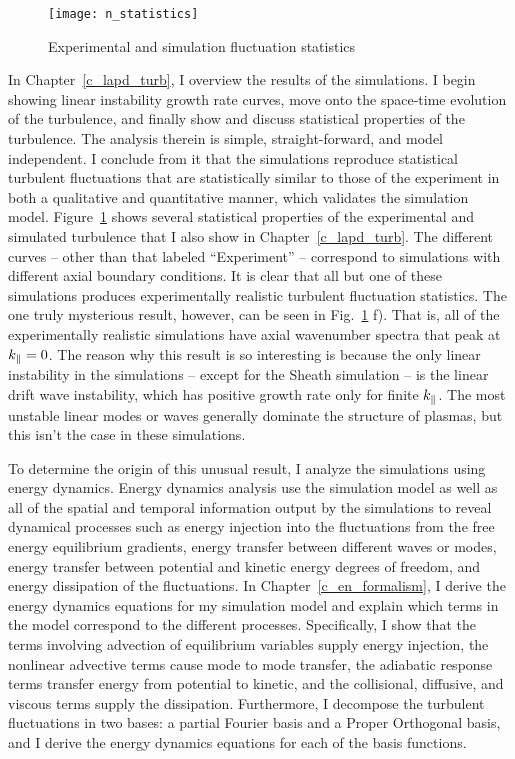 \begin{figure}
\centerline{\texttt{[image: n\_statistics]}}
\caption{Experimental and simulation fluctuation statistics}
\label{n_statistics_intro}
\end{figure}

In Chapter~\ref{c_lapd_turb}, I overview the results of the simulations. I begin showing linear instability growth rate curves, move onto the space-time evolution of the turbulence, and finally
show and discuss statistical properties of the turbulence. The analysis therein is simple, straight-forward, and model independent. I conclude from it that the simulations reproduce
statistical turbulent fluctuations that are statistically similar to those of the experiment in both a qualitative and quantitative manner, which validates the simulation model. 
Figure~\ref{n_statistics_intro} shows several statistical properties of the experimental and simulated turbulence that I also show in Chapter~\ref{c_lapd_turb}. 
The different curves -- other than that labeled ``Experiment'' -- correspond to simulations with different axial boundary conditions. 
It is clear that all but one of these simulations produces experimentally realistic turbulent fluctuation statistics. The one truly mysterious result, however, can be seen in
Fig.~\ref{n_statistics_intro} f). That is, all of the experimentally realistic simulations have axial wavenumber spectra that peak at $k_\parallel = 0$. The reason why this result is so interesting
is because the only linear instability in the simulations -- except for the Sheath simulation -- is the linear drift wave instability, which has positive growth rate only for finite $k_\parallel$.
The most unstable linear modes or waves generally dominate the structure of plasmas, but this isn't the case in these simulations.

To determine the origin of this unusual result, I analyze the simulations using energy dynamics.
Energy dynamics analysis use the simulation model as well as all of the spatial and temporal information output by the simulations to reveal dynamical processes such as 
energy injection into the fluctuations from the free energy equilibrium gradients, energy transfer between different waves or modes,
energy transfer between potential and kinetic energy degrees of freedom, and energy dissipation of the fluctuations. In Chapter~\ref{c_en_formalism}, I derive the energy dynamics equations for my
simulation model and explain which terms in the model correspond to the different processes. Specifically, I show that the terms involving advection of equilibrium variables
supply energy injection, the nonlinear advective terms cause mode to mode transfer, the adiabatic response terms transfer energy from potential to kinetic, and the collisional, diffusive,
and viscous terms supply the dissipation. Furthermore, I decompose the turbulent fluctuations in two bases: a partial Fourier basis and a Proper Orthogonal basis, and
I derive the energy dynamics equations for each of the basis functions.

